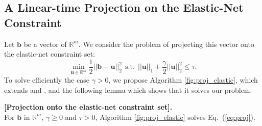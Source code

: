 \documentclass[twoside,11pt]{article}
\def\b{{\mathbf b}}
\def\u{{\mathbf u}}
\def\Real{{\mathbb R}}
\def\u{{\mathbf u}}
\def\st{~~\text{s.t.}~~}
\begin{document}
\subsection{A Linear-time Projection on the Elastic-Net Constraint} \label{appendix:sec:elas}
Let $\b$ be a vector of $\Real^m$. We consider the problem of projecting this vector
onto the elastic-net constraint set:
\begin{equation}
   \min_{\u \in \Real^m} \frac{1}{2}||\b-\u||_2^2 \st ||\u||_1 +
   \frac{\gamma}{2}||\u||_2^2 \leq \tau.\label{eq:proj}
\end{equation}
To solve efficiently the case $\gamma > 0$, we 
propose Algorithm \ref{fig:proj_elastic}, which extends \citet{maculan} and \citet{duchi}, and the following lemma
which shows that it solves our problem.
\begin{lemma}{\bf [Projection onto the elastic-net constraint set].\\}
For $\b$ in $\Real^m$, $\gamma \geq 0$ and $\tau > 0$,
Algorithm \ref{fig:proj_elastic} solves Eq.~(\ref{eq:proj}).
\end{lemma}
\end{document}
